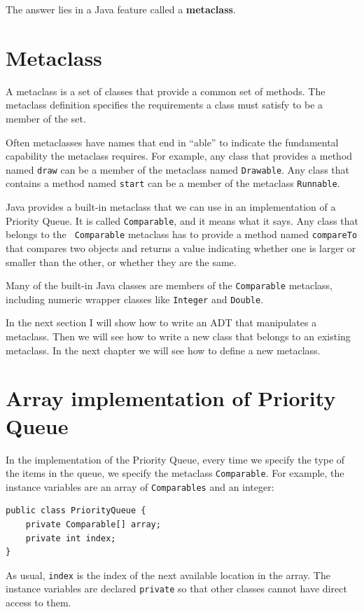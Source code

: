 \documentclass[12pt]{book}
\theoremstyle{exercise}
\begin{document}
The answer lies in a Java feature called a {\bf metaclass}.


\section {Metaclass}

A metaclass is a set of classes that provide a common set of methods.
The metaclass definition specifies the requirements a class must
satisfy to be a member of the set.

Often metaclasses have names that end in ``able'' to indicate
the fundamental capability the metaclass requires.  For
example, any class that provides a method named {\tt draw} can
be a member of the metaclass named {\tt Drawable}.  Any
class that contains a method named {\tt start} can be a member
of the metaclass {\tt Runnable}.

Java provides a built-in metaclass that we can use in an
implementation of a Priority Queue.  It is called {\tt Comparable},
and it means what it says.  Any class that belongs to the {\tt
Comparable} metaclass has to provide a method named {\tt compareTo}
that compares two objects and returns a value indicating whether one
is larger or smaller than the other, or whether they are the same.

Many of the built-in Java classes are members of the {\tt Comparable}
metaclass, including numeric wrapper classes like {\tt Integer}
and {\tt Double}.

In the next section I will show how to write an ADT that manipulates
a metaclass.  Then we will see how to write a new
class that belongs to an existing metaclass.  In the
next chapter we will see how to define a new metaclass.


\section{Array implementation of Priority Queue}

In the implementation of the Priority Queue, every time we specify
the type of the items in the queue, we specify the metaclass
{\tt Comparable}.  For example, the instance variables are an
array of {\tt Comparables} and an integer:

\begin{verbatim}
public class PriorityQueue {
    private Comparable[] array;
    private int index;
}
\end{verbatim}
%
As usual, {\tt index} is the index of the next available location in the
array.  The instance variables are declared {\tt private} so that
other classes cannot have direct access to them.
\end{document}
